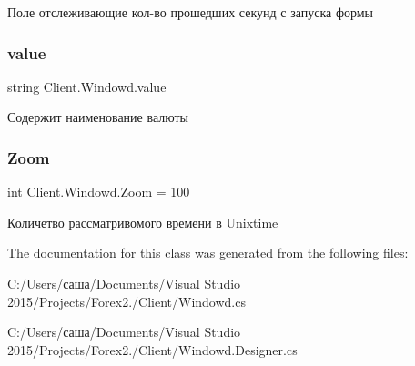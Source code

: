 Поле отслеживающие кол-\/во прошедших секунд с запуска формы 

\hypertarget{class_client_1_1_windowd_a7d221cc5d9347a6064b09db206894342}{}\label{class_client_1_1_windowd_a7d221cc5d9347a6064b09db206894342} 
\subsubsection{\texorpdfstring{value}{value}}
{\footnotesize\ttfamily string Client.\+Windowd.\+value}



Содержит наименование валюты 

\hypertarget{class_client_1_1_windowd_aa41017ef66a809df6898262c5a425303}{}\label{class_client_1_1_windowd_aa41017ef66a809df6898262c5a425303} 
\subsubsection{\texorpdfstring{Zoom}{Zoom}}
{\footnotesize\ttfamily int Client.\+Windowd.\+Zoom = 100}



Количетво рассматривомого времени в Unixtime 



The documentation for this class was generated from the following files\+:\begin{DoxyCompactItemize}
\item 
C\+:/\+Users/саша/\+Documents/\+Visual Studio 2015/\+Projects/\+Forex2./\+Client/Windowd.\+cs\item 
C\+:/\+Users/саша/\+Documents/\+Visual Studio 2015/\+Projects/\+Forex2./\+Client/Windowd.\+Designer.\+cs\end{DoxyCompactItemize}
